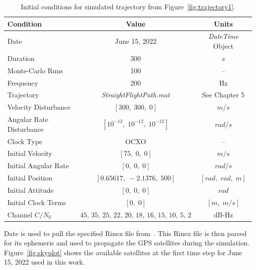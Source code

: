 \begin{table}[!ht]
    \caption{Initial conditions for simulated trajectory from Figure~\ref{fig:trajectory1}.}\label{tbl:trajectory}
    \centering
    \begin{tabular}{lcc}
        \toprule
        \textbf{Condition}       & \textbf{Value}                                      & \textbf{Units}                     \\
        \midrule
        Date                     & June 15, 2022                                       & \textit{DateTime} Object           \\
        Duration                 & 300                                                 & \(s\)                              \\
        Monte-Carlo Runs         & 100                                                 & {--}                               \\
        Frequency                & 200                                                 & Hz                                 \\
        Trajectory               & \textit{StraightFlightPath.mat}                     & See Chapter 5                      \\
        Velocity Disturbance     & \(\left[300, \; 300, \; 0\right]\)                  & \(m/s\)                            \\
        Angular Rate Disturbance & \(\left[10^{-12}, \; 10^{-12}, \; 10^{-12}\right]\) & \(rad/s\)                          \\
        Clock Type               & OCXO                                                & {--}                               \\
        Initial Velocity         & \(\left[75, \; 0, \; 0\right]\)                     & \(m/s\)                            \\
        Initial Angular Rate     & \(\left[0, \; 0, \; 0\right]\)                      & \(rad/s\)                          \\
        Initial Position         & \(\left[0.65617, \; -2.1376, \; 500\right]\)        & \(\left[rad, \; rad, \; m\right]\) \\
        Initial Attitude         & \(\left[0, \; 0, \; 0\right]\)                      & \(rad\)                            \\
        Initial Clock Terms      & \(\left[0, \; 0\right]\)                            & \(\left[m, \; m/s\right]\)         \\
        Channel \(C/N_0\)        & \(45,\,35,\,25,\,22,\,20,\,18,\,16,\,15,\,10,\,5,\,2\)                & dB-Hz                              \\

        \bottomrule
    \end{tabular}
\end{table}
Date is used to pull the specified Rinex file from~\cite{nollCrustalDynamicsData2010}. This Rinex file is then parsed for its ephemeris and used to propagate the GPS satellites during the simulation. Figure~\ref{fig:skyplot} shows the available satellites at the first time step for June 15, 2022 used in this work.

